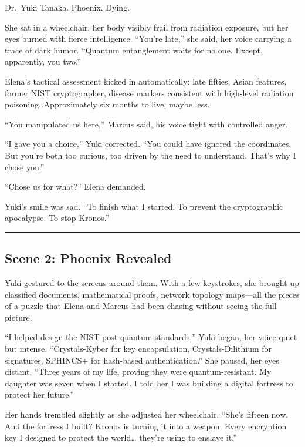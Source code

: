 Dr.~Yuki Tanaka. Phoenix. Dying.

She sat in a wheelchair, her body visibly frail from radiation exposure, but her eyes burned with fierce intelligence. ``You're late,'' she said, her voice carrying a trace of dark humor. ``Quantum entanglement waits for no one. Except, apparently, you two.''

Elena's tactical assessment kicked in automatically: late fifties, Asian features, former NIST cryptographer, disease markers consistent with high-level radiation poisoning. Approximately six months to live, maybe less.

``You manipulated us here,'' Marcus said, his voice tight with controlled anger.

``I gave you a choice,'' Yuki corrected. ``You could have ignored the coordinates. But you're both too curious, too driven by the need to understand. That's why I chose you.''

``Chose us for what?'' Elena demanded.

Yuki's smile was sad. ``To finish what I started. To prevent the cryptographic apocalypse. To stop Kronos.''

\begin{center}\rule{0.5\linewidth}{0.5pt}\end{center}

\hypertarget{scene-2-phoenix-revealed}{%
\subsection{Scene 2: Phoenix Revealed}\label{scene-2-phoenix-revealed}}

Yuki gestured to the screens around them. With a few keystrokes, she brought up classified documents, mathematical proofs, network topology maps---all the pieces of a puzzle that Elena and Marcus had been chasing without seeing the full picture.

``I helped design the NIST post-quantum standards,'' Yuki began, her voice quiet but intense. ``Crystals-Kyber for key encapsulation, Crystals-Dilithium for signatures, SPHINCS+ for hash-based authentication.'' She paused, her eyes distant. ``Three years of my life, proving they were quantum-resistant. My daughter was seven when I started. I told her I was building a digital fortress to protect her future.''

Her hands trembled slightly as she adjusted her wheelchair. ``She's fifteen now. And the fortress I built? Kronos is turning it into a weapon. Every encryption key I designed to protect the world\ldots{} they're using to enslave it.''

